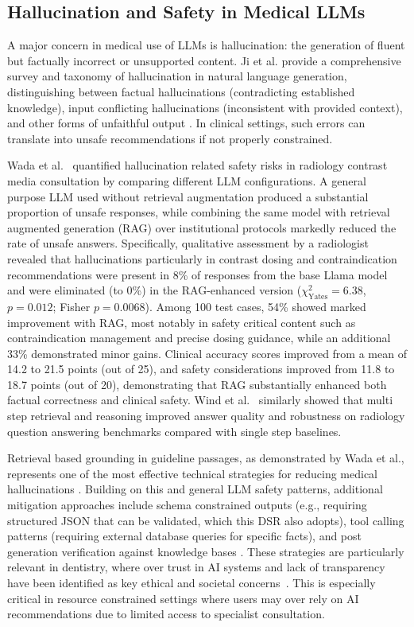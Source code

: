 \documentclass[12pt,a4paper]{report}
\begin{document}
	\subsection{Hallucination and Safety in Medical LLMs}
	
	A major concern in medical use of LLMs is hallucination: the generation of
	fluent but factually incorrect or unsupported content. Ji et al.\cite{ji2023survey} provide a
	comprehensive survey and taxonomy of hallucination in natural language
	generation, distinguishing between factual hallucinations (contradicting
	established knowledge), input conflicting hallucinations (inconsistent with
	provided context), and other forms of unfaithful output \cite{ji2023survey}. In
	clinical settings, such errors can translate into unsafe recommendations if not
	properly constrained.
	
	Wada et al.~\cite{Wada2025RAGRadiology} quantified hallucination related safety risks in radiology contrast media consultation by comparing different LLM configurations. A general purpose LLM used without retrieval augmentation produced a substantial proportion of unsafe responses, while combining the same model with retrieval augmented generation (RAG) over institutional protocols markedly reduced the rate of unsafe answers. Specifically, qualitative assessment by a radiologist revealed that hallucinations particularly in contrast dosing and contraindication recommendations were present in 8\% of responses from the base Llama model and were eliminated (to 0\%) in the RAG-enhanced version ($\chi^2_{\text{Yates}} = 6.38$, $p = 0.012$; Fisher $p = 0.0068$). Among 100 test cases, 54\% showed marked improvement with RAG, most notably in safety critical content such as contraindication management and precise dosing guidance, while an additional 33\% demonstrated minor gains. Clinical accuracy scores improved from a mean of 14.2 to 21.5 points (out of 25), and safety considerations improved from 11.8 to 18.7 points (out of 20), demonstrating that RAG substantially enhanced both factual correctness and clinical safety. Wind et al.~\cite{Wind2025RaRRadiology} similarly showed that multi step retrieval and reasoning improved answer quality and robustness on radiology question answering benchmarks compared with single step baselines.
	
	Retrieval based grounding in guideline passages, as demonstrated by Wada et al.,
	represents one of the most effective technical strategies for reducing medical
	hallucinations \cite{Wada2025RAGRadiology,ji2023survey}. Building on this and
	general LLM safety patterns, additional mitigation approaches include schema constrained
	outputs (e.g., requiring structured JSON that can be validated, which this DSR also adopts), tool calling
	patterns (requiring external database queries for specific facts), and
	post generation verification against knowledge bases
	\cite{ji2023survey,schwendicke2022ai_global}. These strategies are particularly relevant in dentistry, where over trust in AI systems and lack of transparency have been identified as key ethical and societal concerns~\cite{schwendicke2022ai_global,Rokhshad2025}. This is especially critical in resource constrained settings where users may over rely on AI recommendations due to limited access to specialist consultation.
	
\end{document}
